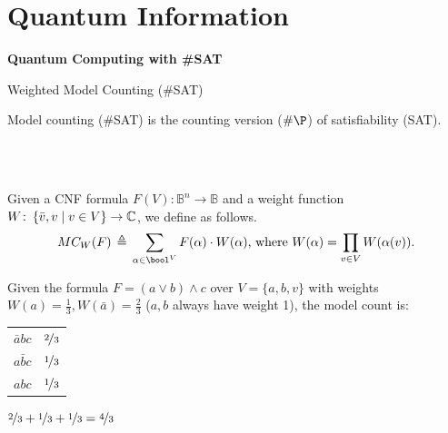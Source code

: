 \section{Quantum Information}


\begin{frame}
\begin{refsection}
	
\vfill

\vspace{-.5cm}\textbf{\Large Quantum Computing with \#SAT}~\cite{mei2024simulating,mei2024eq}\vspace{-.5cm}

\vfill

\printbibliography[section=\therefsection]
\end{refsection}

\end{frame}





\begin{frame}{Weighted Model Counting (\#SAT)}


Model counting (\#SAT) is the counting version ($\#\P$) of satisfiability (SAT).

\pause

~\\
~\\

\begin{definition}
Given a 
	\alert{CNF formula} $F(V) \colon \mathbb B^n \to \mathbb B$ and a 
	\alert{weight function} $W\colon \left\lbrace  \bar v, v \mid v\in V \right\rbrace \to \mathbb{C}$, 
we define  as follows.
\[
MC_W(F) \defn   \sum_{\alpha \in  \bool^V} F(\alpha)\cdot W(\alpha)\text{, where }  W(\alpha) = \prod_{v\in V} W(\alpha(v)).
\]
\end{definition}	

\pause

\begin{example}{}
  Given the formula $F = (a \vee b) \land  c$ over $V=\{a,b, v\}$ with weights $W(a) = \frac13, W(\bar a) = \frac23$ ($a, b$ always have weight 1), the model count is:
  

\hfill 
  \begin{tabular}{|l|l|}
  \hline
  	$\bar a  b  c$ & $\nicefrac 23$ \\
  	 $a \bar b  c$ & $\nicefrac 13$ \\
  	$a b  c$ & $\nicefrac 13$\\
  \hline
  \end{tabular}  
  \hfill 
  $\nicefrac 23 + \nicefrac 13 + \nicefrac 13= \nicefrac 43$
\hfill ~

\end{example}


\end{frame}






